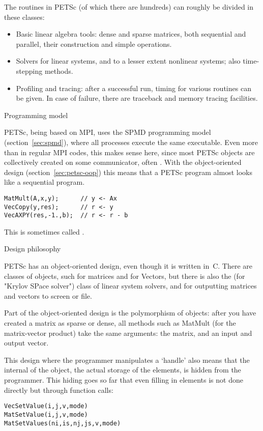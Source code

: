 The routines in PETSc (of which there are hundreds) can roughly be
divided in these classes:
\begin{itemize}
\item Basic linear algebra tools: dense and sparse matrices, both
  sequential and parallel, their construction and simple operations.
\item Solvers for linear systems, and to a lesser extent nonlinear
  systems; also time-stepping methods.
\item Profiling and tracing: after a successful run, timing for
  various routines can be given. In case of failure, there are
  traceback and memory tracing facilities.
\end{itemize}

 {Programming model}

PETSc, being based on MPI, uses the \ac{SPMD} programming model
(section~\ref{sec:spmd}), where all processes execute the same
executable. Even more than in regular MPI codes, this makes sense
here, since most PETSc objects are collectively created on some
communicator, often . With the
object-oriented design (section~\ref{sec:petsc-oop}) this means that a
PETSc program almost looks like a sequential program.
\begin{lstlisting}
MatMult(A,x,y);      // y <- Ax
VecCopy(y,res);      // r <- y
VecAXPY(res,-1.,b);  // r <- r - b
\end{lstlisting}
This is
sometimes called .

 {Design philosophy}
\label{sec:petsc-oop}

PETSc has an object-oriented design, even though it is written
in~C. There are classes of objects, such  for
matrices and  for Vectors, but there is also the
 (for "Krylov SPace solver") class of linear system solvers, and
 for outputting matrices and vectors to screen or file.

Part of the object-oriented design is the polymorphism of objects:
after you have created a  matrix as sparse or dense, all methods
such as MatMult (for the matrix-vector product) take the same
arguments: the matrix, and an input and output vector.

This design where the programmer manipulates a `handle' also means
that the internal of the object, the actual storage of the elements,
is hidden from the programmer. This hiding goes so far that even
filling in elements is not done directly but through function calls:
\begin{lstlisting}
VecSetValue(i,j,v,mode)
MatSetValue(i,j,v,mode)
MatSetValues(ni,is,nj,js,v,mode)
\end{lstlisting}


